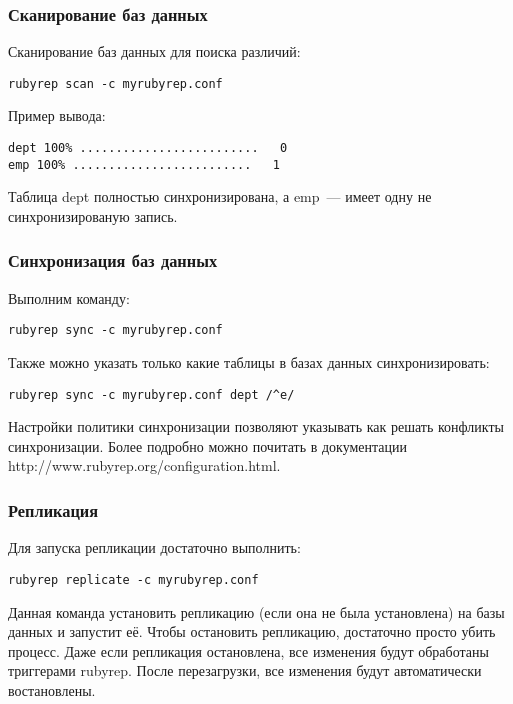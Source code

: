 \subsubsection{Сканирование баз данных}
Сканирование баз данных для поиска различий:
\begin{lstlisting}[label=lst:rubyrep6,caption=Сканирование баз данных]
rubyrep scan -c myrubyrep.conf
\end{lstlisting}

Пример вывода:
\begin{lstlisting}[label=lst:rubyrep7,caption=Сканирование баз данных]
dept 100% .........................   0
emp 100% .........................   1
\end{lstlisting}

Таблица dept полностью синхронизирована, а emp~--- имеет одну не синхронизированую запись.

\subsubsection{Синхронизация баз данных}
Выполним команду:
\begin{lstlisting}[label=lst:rubyrep8,caption=Синхронизация баз данных]
rubyrep sync -c myrubyrep.conf
\end{lstlisting}

Также можно указать только какие таблицы в базах данных синхронизировать:
\begin{lstlisting}[label=lst:rubyrep9,caption=Синхронизация баз данных]
rubyrep sync -c myrubyrep.conf dept /^e/
\end{lstlisting}

Настройки политики синхронизации позволяют указывать как решать конфликты синхронизации. 
Более подробно можно почитать в документации http://www.rubyrep.org/configuration.html. 

\subsubsection{Репликация}
Для запуска репликации достаточно выполнить:
\begin{lstlisting}[label=lst:rubyrep10,caption=Репликация]
rubyrep replicate -c myrubyrep.conf
\end{lstlisting}

Данная команда установить репликацию (если она не была установлена) на базы данных и запустит её.
Чтобы остановить репликацию, достаточно просто убить процесс. Даже если репликация остановлена, 
все изменения будут обработаны триггерами rubyrep. После перезагрузки, все изменения 
будут автоматически востановлены.

